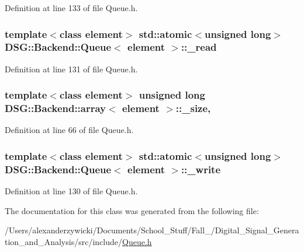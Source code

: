 Definition at line 133 of file Queue.\+h.

\hypertarget{classDSG_1_1Backend_1_1Queue_a10510513da0290a435fe47079287cf29}{
\subsubsection[{\+\_\+read}]{\setlength{\rightskip}{0pt plus 5cm}template$<$class element$>$ std\+::atomic$<$unsigned long$>$ {\bf D\+S\+G\+::\+Backend\+::\+Queue}$<$ element $>$\+::\+\_\+read\hspace{0.3cm}{\ttfamily [protected]}}}\label{classDSG_1_1Backend_1_1Queue_a10510513da0290a435fe47079287cf29}


Definition at line 131 of file Queue.\+h.

\hypertarget{classDSG_1_1Backend_1_1array_a44349f32c09ebb31d5eadbe9a222cba2}{
\subsubsection[{\+\_\+size}]{\setlength{\rightskip}{0pt plus 5cm}template$<$class element$>$ unsigned long {\bf D\+S\+G\+::\+Backend\+::array}$<$ element $>$\+::\+\_\+size\hspace{0.3cm}{\ttfamily [protected]}, {\ttfamily [inherited]}}}\label{classDSG_1_1Backend_1_1array_a44349f32c09ebb31d5eadbe9a222cba2}


Definition at line 66 of file Queue.\+h.

\hypertarget{classDSG_1_1Backend_1_1Queue_adbbe7e332752d500e7b9fadeb08cac54}{
\subsubsection[{\+\_\+write}]{\setlength{\rightskip}{0pt plus 5cm}template$<$class element$>$ std\+::atomic$<$unsigned long$>$ {\bf D\+S\+G\+::\+Backend\+::\+Queue}$<$ element $>$\+::\+\_\+write\hspace{0.3cm}{\ttfamily [protected]}}}\label{classDSG_1_1Backend_1_1Queue_adbbe7e332752d500e7b9fadeb08cac54}


Definition at line 130 of file Queue.\+h.



The documentation for this class was generated from the following file\+:\begin{DoxyCompactItemize}
\item 
/\+Users/alexanderzywicki/\+Documents/\+School\+\_\+\+Stuff/\+Fall\+\_/\+Digital\+\_\+\+Signal\+\_\+\+Generation\+\_\+and\+\_\+\+Analysis/src/include/\hyperlink{Queue_8h}{Queue.\+h}\end{DoxyCompactItemize}
